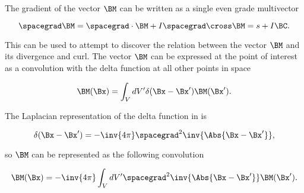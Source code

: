 %
%
The gradient of the vector \( \BM \) can be written as a single even grade multivector

\begin{equation}\label{eqn:helmholtzDerviationMultivector:60}
\spacegrad \BM
= \spacegrad \cdot \BM + I \spacegrad \cross \BM
= s + I \BC.
\end{equation}

%
%
%

This can be used to attempt to discover the relation between the vector \( \BM \) and its divergence and curl.  
The vector \( \BM \) can be expressed at the point of interest as a convolution with the delta function at all other points in space

\begin{dmath}\label{eqn:helmholtzDerviationMultivector:80}
\BM(\Bx) = \int_V dV' \delta(\Bx - \Bx') \BM(\Bx').
\end{dmath}

The Laplacian representation of the delta function in  is

\begin{dmath}\label{eqn:helmholtzDerviationMultivector:100}
\delta(\Bx - \Bx') = -\inv{4\pi} \spacegrad^2 \inv{\Abs{\Bx - \Bx'}},
\end{dmath}

so \( \BM \) can be represented as the following convolution

\begin{dmath}\label{eqn:helmholtzDerviationMultivector:120}
\BM(\Bx) = -\inv{4\pi} \int_V dV' \spacegrad^2 \inv{\Abs{\Bx - \Bx'}} \BM(\Bx').
\end{dmath}

%
%

